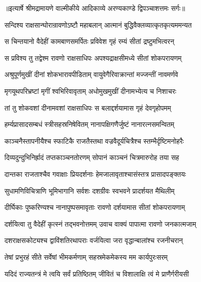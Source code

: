 {॥इत्यार्षे श्रीमद्रामायणे वाल्मीकीये आदिकाव्ये अरण्यकाण्डे द्विपञ्चाशत्तमः सर्गः॥}


\twolineshloka
{सन्दिश्य राक्षसान्घोरान्रावणोऽष्टौ महाबलान्}
{आत्मानं बुद्धिवैक्लव्यात्कृतकृत्यममन्यत} %

\twolineshloka
{स चिन्तयानो वैदेहीं कामबाणसमर्पितः}
{प्रविवेश गृहं रम्यं सीतां द्रष्टुमभित्वरन्} %

\twolineshloka
{स प्रविश्य तु तद्वेश्म रावणो राक्षसाधिपः}
{अपश्यद्राक्षसीमध्ये सीतां शोकपरायणम्} %

\twolineshloka
{अश्रुपूर्णमुखीं दीनां शोकभारावपीडिताम्}
{वायुवेगैरिवाक्रान्तां मज्जन्तीं नावमर्णवे} %

\twolineshloka
{मृगयूथपरिभ्रष्टां मृगीं श्वभिरिवावृताम्}
{अधोमुखमुखीं दीनामभ्येत्य च निशाचरः} %

\twolineshloka
{तां तु शोकवशां दीनामवशां राक्षसाधिपः}
{स बलाद्दर्शयामास गृहं देवगृहोपमम्} %

\twolineshloka
{हर्म्यप्रासादसम्बधं स्त्रीसहस्रनिषेवितम्}
{नानापक्षिगणैर्जुष्टं नानारत्नसमन्वितम्} %

\twolineshloka
{काञ्चनैस्तापनीयैश्च स्फाटिकै राजतैस्तथा}
{वज्रवैदूर्यचित्रैश्च स्तम्भैर्दृष्टिमनोहरैः} %

\twolineshloka
{दिव्यदुन्दुभिनिर्ह्रादं तप्तकाञ्चनतोरणम्}
{सोपानं काञ्चनं चित्रमारुरोह तया सह} %

\twolineshloka
{दान्तका राजताश्चैव गवाक्षाः प्रियदर्शनाः}
{हेमजालावृताश्चासंस्तत्र प्रासादपङ्क्तयः} %

\twolineshloka
{सुधामणिविचित्राणि भूमिभागानि सर्वशः}
{दशग्रीवः स्वभवने प्रादर्शयत मैथिलीम्} %

\twolineshloka
{दीर्घिकाः पुष्करिण्यश्च नानापुष्पसमावृताः}
{रावणो दर्शयामास सीतां शोकपरायणाम्} %

\twolineshloka
{दर्शयित्वा तु वैदेहीं कृत्स्नं तद्भवनोत्तमम्}
{उवाच वाक्यं पापात्मा रावणो जनकात्मजाम्} %

\twolineshloka
{दशराक्षसकोट्यश्च द्वाविंशतिरथापराः}
{वर्जयित्वा जरा वृद्धान्बालांश्च रजनीचरान्} %

\twolineshloka
{तेषां प्रभुरहं सीते सर्वेषां भीमकर्मणाम्}
{सहस्रमेकमेकस्य मम कार्यपुरःसरम्} %

\twolineshloka
{यदिदं राज्यतन्त्रं मे त्वयि सर्वं प्रतिष्ठितम्}
{जीवितं च विशालाक्षि त्वं मे प्राणैर्गरीयसी} %

